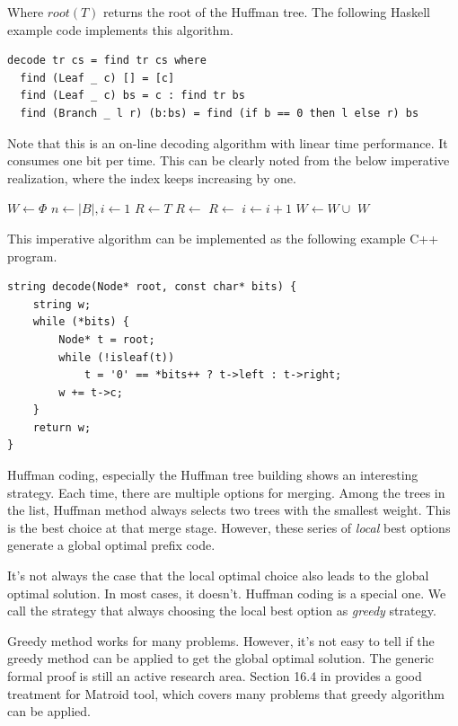 \documentclass[UTF8]{article}
\begin{document}
Where $root(T)$ returns the root of the Huffman tree. The following Haskell example
code implements this algorithm.

\lstset{language=Haskell}
\begin{lstlisting}
decode tr cs = find tr cs where
  find (Leaf _ c) [] = [c]
  find (Leaf _ c) bs = c : find tr bs
  find (Branch _ l r) (b:bs) = find (if b == 0 then l else r) bs
\end{lstlisting}

Note that this is an on-line decoding algorithm with linear time performance. It consumes
one bit per time. This can be clearly noted from the below imperative
realization, where the index keeps increasing by one.

\begin{algorithmic}[1]
  \State $W \gets \Phi$
  \State $n \gets |B|, i \gets 1$
    \State $R \gets T$
        \State $R \gets$ 
      \Else
        \State $R \gets$ 
      \EndIf
      \State $i \gets i + 1$
    \EndWhile
    \State $W \gets W \cup$ 
  \EndWhile
  \State \Return $W$
\EndFunction
\end{algorithmic}

This imperative algorithm can be implemented as the following example C++ program.

\lstset{language=C++}
\begin{lstlisting}
string decode(Node* root, const char* bits) {
    string w;
    while (*bits) {
        Node* t = root;
        while (!isleaf(t))
            t = '0' == *bits++ ? t->left : t->right;
        w += t->c;
    }
    return w;
}
\end{lstlisting}

Huffman coding, especially the Huffman tree building shows an interesting strategy.
Each time, there are multiple options for merging. Among the trees in the list,
Huffman method always selects two trees with the smallest weight. This is the
best choice at that merge stage. However, these series of {\em local} best options
generate a global optimal prefix code.

It's not always the case that the local optimal choice also leads to the global optimal
solution. In most cases, it doesn't. Huffman coding is a special one. We call
the strategy that always choosing the local best option as {\em greedy} strategy.

Greedy method works for many problems. However, it's not easy to tell if the greedy
method can be applied to get the global optimal solution. The generic formal proof
is still an active research area. Section 16.4 in \cite{CLRS} provides a good
treatment for Matroid tool, which covers many problems that greedy algorithm
can be applied.
\end{document}
